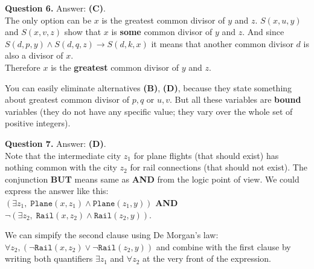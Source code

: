 \documentclass[jou]{apa6}
\begin{document}
\vspace{6pt}
{\bf Question 6.} Answer: {\bf (C)}.\\
The only option can be $x$ is the greatest common divisor of $y$ and $z$. 
$S(x,u,y)$ and $S(x,v,z)$ show that $x$ is {\bf some} common divisor of 
$y$ and $z$. And since $S(d,p,y) \wedge S(d,q,z) \rightarrow S(d,k,x)$ 
it means that another common divisor $d$ is also a divisor of $x$.\\
Therefore $x$ is the {\bf greatest} common divisor of $y$ and $z$. 

You can easily eliminate alternatives {\bf (B)}, {\bf (D)}, because
they state something about greatest common divisor of $p,q$ or $u,v$. 
But all these variables are {\bf bound} variables (they do not 
have any specific value; they vary over the whole set of positive integers). 


\vspace{6pt}
{\bf Question 7.} Answer: {\bf (D)}.\\
Note that the intermediate city $z_1$ for plane flights (that should exist)
has nothing common with the city $z_2$ for rail connections (that should not exist).
The conjunction {\bf BUT} means same as {\bf AND} from the logic point of view. 
We could express the answer like this:\\
$(\exists z_1,\; \mathtt{Plane}(x,z_1) \wedge \mathtt{Plane}(z_1,y))$ {\bf AND}\\
$\neg (\exists z_2,\; \mathtt{Rail}(x,z_2) \wedge \mathtt{Rail}(z_2,y))$. 

We can simpify the second clause using De Morgan's law:
$\forall z_2, (\neg \mathtt{Rail}(x,z_2) \vee \neg \mathtt{Rail}(z_2,y))$ and 
combine with the first clause by writing both quantifiers $\exists z_1$ and
$\forall z_2$ at the very front of the expression. 
\end{document}
